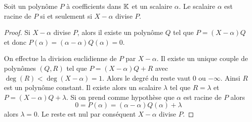 \begin{prop}
  Soit un polynôme $P$ à coefficients dans $\mathbb{K}$ et un scalaire $\alpha$. Le scalaire $\alpha$ est racine de $P$ si et seulement si $X-\alpha$ divise $P$.
\end{prop}
\begin{proof}
  Si $X-\alpha$ divise $P$, alors il existe un polynôme $Q$ tel que $P=(X-\alpha)Q$ et donc $P(\alpha)=(\alpha-\alpha)Q(\alpha)=0$.

  On effectue la division euclidienne de $P$ par $X-\alpha$. Il existe un unique couple de polynômes $(Q,R)$ tel que $P=(X-\alpha)Q+R$ avec $\deg(R) < \deg(X-\alpha)=1$. Alors le degré du reste vaut $0$ ou $-\infty$. Ainsi $R$ est un polynôme constant. Il existe alors un scalaire $\lambda$ tel que $R=\lambda$ et $P=(X-\alpha)Q+\lambda$. Si on prend comme hypothèse que $\alpha$ est racine de $P$ alors
  \begin{equation}
    0 = P(\alpha) = (\alpha-\alpha)Q(\alpha)+ \lambda
  \end{equation}
  alors $\lambda=0$. Le reste est nul par conséquent $X-\alpha$ divise $P$.
\end{proof}

